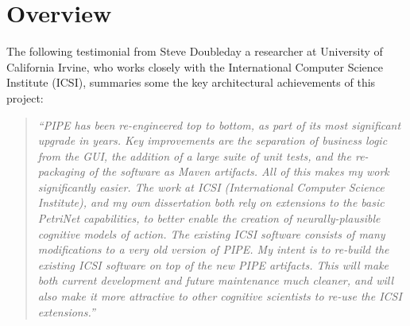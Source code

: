 \section{Overview}


The following testimonial from Steve Doubleday a researcher at University of California Irvine, who works closely with the International Computer Science Institute (ICSI), summaries some the key architectural achievements of this project:

\begin{quote}
\singlespacing
    \textit{``PIPE has been re-engineered top to bottom, as part of its most significant upgrade in years. Key improvements are the separation of business logic from the GUI, the addition of a large suite of unit tests, and the re-packaging of the software as Maven artifacts.  All of this makes my work significantly easier. The work at ICSI (International Computer Science Institute), and my own dissertation both rely on extensions to the basic PetriNet capabilities, to better enable the creation of neurally-plausible cognitive models of action. The existing ICSI software consists of many modifications to a very old version of PIPE. My intent is to re-build the existing ICSI software on top of the new PIPE artifacts. This will make both current development and future maintenance much cleaner, and will also make it more attractive to other cognitive scientists to re-use the ICSI extensions.''}
\end{quote}
